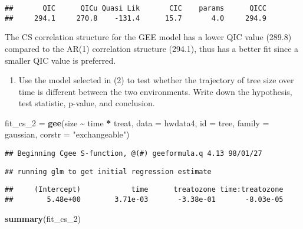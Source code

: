 \documentclass[
]{article}
\newenvironment{Shaded}{\begin{snugshade}}{\end{snugshade}}
\newcommand{\AttributeTok}[1]{\textcolor[rgb]{0.13,0.29,0.53}{#1}}
\newcommand{\FunctionTok}[1]{\textcolor[rgb]{0.13,0.29,0.53}{\textbf{#1}}}
\newcommand{\NormalTok}[1]{#1}
\newcommand{\OtherTok}[1]{\textcolor[rgb]{0.56,0.35,0.01}{#1}}
\newcommand{\SpecialCharTok}[1]{\textcolor[rgb]{0.81,0.36,0.00}{\textbf{#1}}}
\newcommand{\StringTok}[1]{\textcolor[rgb]{0.31,0.60,0.02}{#1}}
\providecommand{\tightlist}{%
  \setlength{\itemsep}{0pt}\setlength{\parskip}{0pt}}
\begin{document}
\begin{verbatim}
##       QIC      QICu Quasi Lik       CIC    params      QICC 
##     294.1     270.8    -131.4      15.7       4.0     294.9
\end{verbatim}

The CS correlation structure for the GEE model has a lower QIC value
(289.8) compared to the AR(1) correlation structure (294.1), thus has a
better fit since a smaller QIC value is preferred.

\begin{enumerate}
\def\labelenumi{\arabic{enumi}.}
\setcounter{enumi}{2}
\tightlist
\item
  Use the model selected in (2) to test whether the trajectory of tree
  size over time is different between the two environments. Write down
  the hypothesis, test statistic, p-value, and conclusion.
\end{enumerate}

\begin{Shaded}
\begin{Highlighting}[]
\NormalTok{fit\_cs\_2 }\OtherTok{=} 
  \FunctionTok{gee}\NormalTok{(size }\SpecialCharTok{\textasciitilde{}}\NormalTok{ time }\SpecialCharTok{*}\NormalTok{ treat, }
      \AttributeTok{data =}\NormalTok{ hwdata4, }
      \AttributeTok{id =}\NormalTok{ tree, }
      \AttributeTok{family =}\NormalTok{ gaussian,}
      \AttributeTok{corstr =} \StringTok{"exchangeable"}\NormalTok{)}
\end{Highlighting}
\end{Shaded}

\begin{verbatim}
## Beginning Cgee S-function, @(#) geeformula.q 4.13 98/01/27
\end{verbatim}

\begin{verbatim}
## running glm to get initial regression estimate
\end{verbatim}

\begin{verbatim}
##     (Intercept)            time      treatozone time:treatozone 
##        5.48e+00        3.71e-03       -3.38e-01       -8.03e-05
\end{verbatim}

\begin{Shaded}
\begin{Highlighting}[]
\FunctionTok{summary}\NormalTok{(fit\_cs\_2)}
\end{Highlighting}
\end{Shaded}
\end{document}
